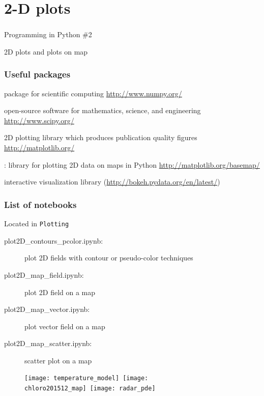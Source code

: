 \section{2-D plots}

{
\begin{frame}
\frametitle{}
{\fontsize{40}{50}\selectfont Programming in Python \#2} 

{\huge 2D plots and plots on map} 

\end{frame}
}

\begin{frame}
\frametitle{Useful packages}

\begin{description}
\item<1->[NumPy:] package for scientific computing \url{http://www.numpy.org/}
\item<1->[SciPy:] open-source software for mathematics, science, and engineering \url{http://www.scipy.org/}
\item<2->[matplotlib:] 2D plotting library which produces publication quality figures \url{http://matplotlib.org/}
\item<3->[Basemap toolkit]: library for plotting 2D data on maps in Python \url{http://matplotlib.org/basemap/}
\item[]
\item<4->[Bokeh:] interactive visualization library (\url{http://bokeh.pydata.org/en/latest/}) 
\end{description}
\end{frame}


\begin{frame}[c, fragile]
\frametitle{List of notebooks}

Located in \verb|Plotting|

{
\scriptsize
\begin{description}
\item[plot2D\_contours\_pcolor.ipynb:] plot 2D fields with contour or pseudo-color techniques       
\item[]
\item[plot2D\_map\_field.ipynb:] plot 2D field on a map              
\item[plot2D\_map\_vector.ipynb:] plot vector field on a map
\item[plot2D\_map\_scatter.ipynb:] scatter plot on a map
\end{description}
}

\begin{figure}
\texttt{[image: temperature\_model]}~\texttt{[image: chloro201512\_map]}~\texttt{[image: radar\_pde]}
\end{figure}
\end{frame}

